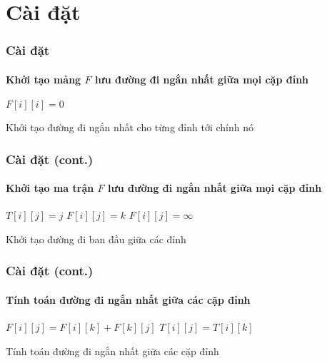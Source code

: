 \documentclass[12pt]{beamer}
\begin{document}
    \section{Cài đặt}
    \begin{frame}
        \frametitle{Cài đặt}
        \framesubtitle{Khởi tạo mảng $F$ lưu đường đi ngắn nhất giữa mọi cặp đỉnh}
        \begin{algorithm}[H]
            \begin{algorithmic}[1]
                \STATE $F[i][i] = 0$
                \ENDFOR
            \end{algorithmic}
            \caption{Khởi tạo đường đi ngắn nhất cho từng đỉnh tới chính nó}
        \end{algorithm}
    \end{frame}
    \begin{frame}
        \frametitle{Cài đặt (cont.)}
        \framesubtitle{Khởi tạo ma trận $F$ lưu đường đi ngắn nhất giữa mọi cặp đỉnh}
        \begin{algorithm}[H]
            \begin{algorithmic}[1]
                \STATE $T[i][j] = j$
                \STATE $F[i][j] = k$
                \ELSE
                \STATE $F[i][j] = \infty$
                \ENDIF
                \ENDIF
                \ENDFOR
                \ENDFOR
            \end{algorithmic}
            \caption{Khởi tạo đường đi ban đầu giữa các đỉnh}
        \end{algorithm}
    \end{frame}
    \begin{frame}
        \frametitle{Cài đặt (cont.)}
        \framesubtitle{Tính toán đường đi ngắn nhất giữa các cặp đỉnh}
        \begin{algorithm}[H]
            \begin{algorithmic}[1]
                \STATE $F[i][j] = F[i][k] + F[k][j]$
                \STATE $T[i][j] = T[i][k]$
                \ENDIF
                \ENDFOR
                \ENDFOR
                \ENDFOR
            \end{algorithmic}
            \caption{Tính toán đường đi ngắn nhất giữa các cặp đỉnh}
            \label{alg:seq}
        \end{algorithm}
    \end{frame}
\end{document}
